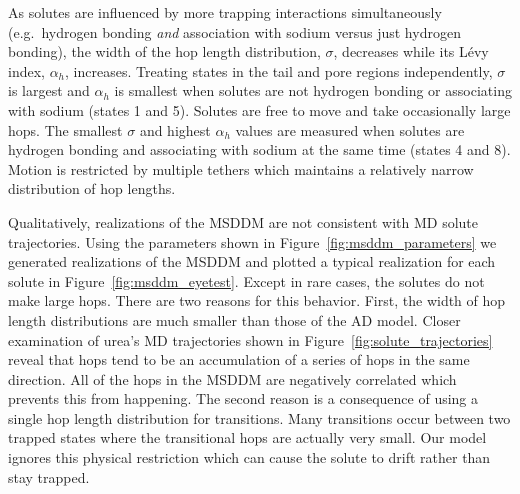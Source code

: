 \documentclass[12pt]{article}
\begin{document}
  As solutes are influenced by more trapping interactions simultaneously (e.g.~hydrogen
  bonding \textit{and} association with sodium versus just hydrogen bonding), the 
  width of the hop length distribution, $\sigma$, decreases while its L\'evy index,
  $\alpha_h$, increases. Treating states in the tail and pore regions independently, 
  $\sigma$ is largest and $\alpha_h$ is smallest when solutes are not hydrogen bonding
  or associating with sodium (states 1 and 5). Solutes are free to move and take 
  occasionally large hops. The smallest $\sigma$ and highest $\alpha_h$ values are
  measured when solutes are hydrogen bonding and associating with sodium at the
  same time (states 4 and 8). Motion is restricted by multiple tethers which 
  maintains a relatively narrow distribution of hop lengths.
  

  Qualitatively, realizations of the MSDDM are not consistent with MD solute
  trajectories. Using the parameters shown in Figure~\ref{fig:msddm_parameters}
  we generated realizations of the MSDDM and plotted a typical realization for each
  solute in Figure~\ref{fig:msddm_eyetest}. Except in rare cases, the solutes do not make
  large hops. There are two reasons for this behavior. First, the width of 
  hop length distributions are much smaller than those of the AD model. Closer
  examination of urea's MD trajectories shown in Figure~\ref{fig:solute_trajectories} 
  reveal that hops tend to be an accumulation of a series of hops in the same direction.
  All of the hops in the MSDDM are negatively correlated which prevents this from happening.
  The second reason is a consequence of using a single hop length distribution 
  for transitions. Many transitions occur between two trapped states where the 
  transitional hops are actually very small. Our model ignores this physical 
  restriction which can cause the solute to drift rather than stay trapped.
  
\end{document}
